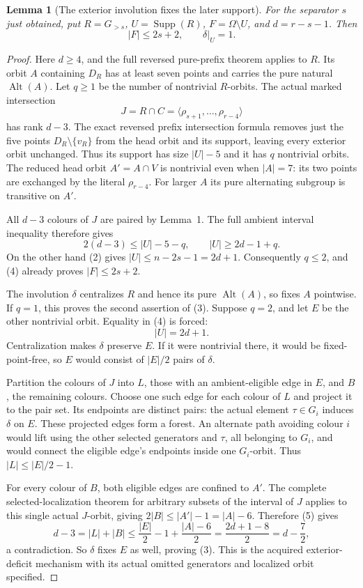 \documentclass[11pt,a4paper]{article}
\newtheorem{lemma}{Lemma}
\newcommand{\gen}[1]{\langle#1\rangle}
\newcommand{\Alt}{\operatorname{Alt}}
\begin{document}
\begin{lemma}[The exterior involution fixes the later support]
For the separator $s$ just obtained, put
$R=G_{>s}$, $U=\operatorname{Supp}(R)$, $F=\Omega\setminus U$,
and $d=r-s-1$. Then
\[
                         |F|\le2s+2,\qquad \delta|_U=1.
                                                               \tag{3}
\]
\end{lemma}
\begin{proof}
Here $d\ge4$, and the full reversed pure-prefix theorem
applies to $R$. Its orbit $A$ containing $D_R$ has at least
seven points and carries the pure natural $\Alt(A)$.
Let $q\ge1$ be the number of nontrivial $R$-orbits.
The actual marked intersection
\[
 J=R\cap C=\gen{\rho_{s+1},\ldots,\rho_{r-4}}
\]
has rank $d-3$. The exact reversed prefix intersection formula
removes just the five points $D_R\setminus\{v_R\}$ from
the head orbit and its support, leaving every exterior orbit
unchanged. Thus its support has size $|U|-5$ and it has $q$
nontrivial orbits. The reduced head orbit $A'=A\cap V$ is
nontrivial even when $|A|=7$: its two points are exchanged
by the literal $\rho_{r-4}$. For larger $A$ its pure alternating
subgroup is transitive on $A'$.

All $d-3$ colours of $J$ are paired by Lemma~1. The full
ambient interval inequality therefore gives
\[
       2(d-3)\le |U|-5-q,\qquad |U|\ge2d-1+q.          \tag{4}
\]
On the other hand (2) gives $|U|\le n-2s-1=2d+1$.
Consequently $q\le2$, and (4) already proves
$|F|\le2s+2$.

The involution $\delta$ centralizes $R$ and hence its pure
$\Alt(A)$, so fixes $A$ pointwise. If $q=1$, this proves
the second assertion of (3). Suppose $q=2$, and let $E$
be the other nontrivial orbit. Equality in (4) is forced:
\[
                         |U|=2d+1.                    \tag{5}
\]
Centralization makes $\delta$ preserve $E$. If it were
nontrivial there, it would be fixed-point-free, so $E$
would consist of $|E|/2$ pairs of $\delta$.

Partition the colours of $J$ into $L$, those with an
ambient-eligible edge in $E$, and $B$, the remaining colours.
Choose one such edge for each colour of $L$ and project it
to the pair set. Its endpoints are distinct pairs: the actual
element $\tau\in G_i$ induces $\delta$ on $E$. These
projected edges form a forest. An alternate path avoiding
colour $i$ would lift using the other selected generators
and $\tau$, all belonging to $G_i$, and would connect the
eligible edge's endpoints inside one $G_i$-orbit.
Thus $|L|\le |E|/2-1$.

For every colour of $B$, both eligible edges are confined
to $A'$. The complete selected-localization theorem for
arbitrary subsets of the interval of $J$ applies to this
single actual $J$-orbit, giving
$2|B|\le |A'|-1=|A|-6$. Therefore (5) gives
\[
 d-3=|L|+|B|
 \le\frac{|E|}{2}-1+\frac{|A|-6}{2}
 =\frac{2d+1-8}{2}=d-\frac72,
\]
a contradiction. So $\delta$ fixes $E$ as well, proving (3).
This is the acquired exterior-deficit mechanism with its
actual omitted generators and localized orbit specified.
\end{proof}
\end{document}
